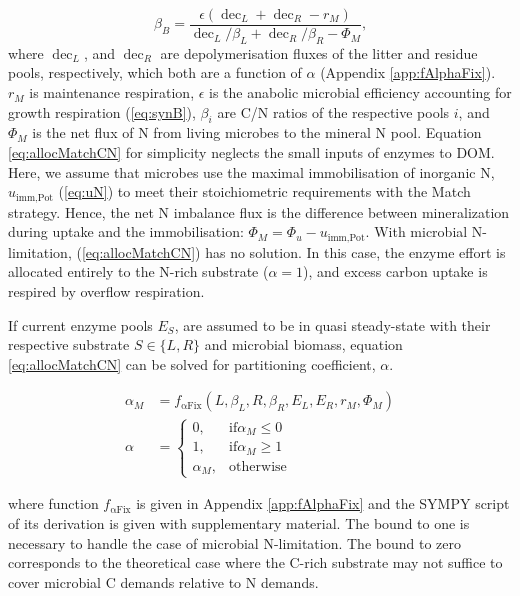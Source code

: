 \begin{equation}
\label{eq:allocMatchCN}
\beta_B = \frac{\epsilon (\operatorname{dec}_L + \operatorname{dec}_R - r_M)}{
\operatorname{dec}_L/\beta_L + \operatorname{dec}_R/\beta_R  - \Phi_M } 
\text{,}
\end{equation}
where $\operatorname{dec}_L$, and $\operatorname{dec}_R$ are depolymerisation
fluxes of the litter and residue pools, respectively, which both are a function
of $\alpha$ (Appendix \ref{app:fAlphaFix}). $r_M$ is maintenance respiration,
$\epsilon$ is the anabolic microbial efficiency accounting for growth
respiration (\ref{eq:synB}), $\beta_i$ are C/N ratios of the respective pools
$i$, and $\Phi_M$ is the net flux of N from living microbes to the mineral N
pool. Equation \ref{eq:allocMatchCN} for simplicity neglects the small inputs of
enzymes to DOM. Here, we assume that microbes use the maximal immobilisation of
inorganic N, $u_{\operatorname{imm,Pot}}$ (\ref{eq:uN}) to meet their
stoichiometric requirements with the Match strategy. Hence, the net N
imbalance flux is the difference between mineralization during uptake and the
immobilisation:
$\Phi_M = \Phi_u - u_{\operatorname{imm,Pot}}$. With microbial N-limitation,
(\ref{eq:allocMatchCN}) has no solution. In this case, the enzyme effort is
allocated entirely to the N-rich substrate ($\alpha=1$), and excess carbon uptake
is respired by overflow respiration.

If current enzyme pools $E_S$, are assumed to be in quasi steady-state with
their respective substrate $S \in \{L,R\}$ and microbial biomass, equation
\ref{eq:allocMatchCN} can be solved for partitioning coefficient, $\alpha$.

\begin{subequations}
\label{eq:allocMatch} 
\begin{align}
\alpha_M &= f_{\operatorname{{\alpha}Fix}}(L,\beta_L,R,\beta_R, E_L, E_R, r_M,
\Phi_M)
\\
\alpha &= \begin{cases}
  0,  & \text{if} \alpha_M \le 0 \\
  1,  & \text{if} \alpha_M \ge 1 \\
  \alpha_M, & \text{otherwise}
\end{cases}   
\end{align}
\end{subequations} 

\noindent where function $f_{\operatorname{{\alpha}Fix}}$ is given in Appendix
\ref{app:fAlphaFix} and the SYMPY script of its derivation is given with
supplementary material. The bound to one is necessary to handle the case of
microbial N-limitation. The bound to zero corresponds to the theoretical case
where the C-rich substrate may not suffice to cover microbial C demands relative
to N demands.

